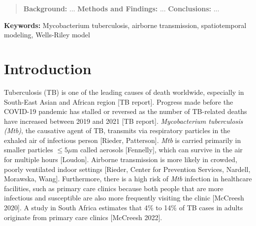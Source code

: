 \documentclass[fleqn,11pt]{wlscirep}
\begin{document}

\begin{abstract}\normalfont
\noindent\textbf{Background:} ... \medskip
\noindent\textbf{Methods and Findings:} ... 
\medskip %
\noindent\textbf{Conclusions:} ... 

\par
\end{abstract}


\flushbottom
\maketitle
\setcounter{page}{1}
\thispagestyle{fancy}

\vspace{2em}


\vspace{0.5em}

\noindent\textbf{Keywords:} Mycobacterium tuberculosis, airborne transmission, spatiotemporal modeling, Wells-Riley model
\newpage

\sloppy
\raggedbottom

\newpage

\section{Introduction} 

Tuberculosis (TB) is one of the leading causes of death worldwide, especially in South-East Asian and African region [TB report]. Progress made before the COVID-19 pandemic has stalled or reversed as the number of TB-related deaths have increased between 2019 and 2021 [TB report]. \emph{Mycobacterium tuberculosis (Mtb)}, the causative agent of TB, transmits via respiratory particles in the exhaled air of infectious person [Rieder, Patterson]. \emph{Mtb} is carried primarily in smaller particles $\leq5\mu$m called aerosols [Fennelly], which can survive in the air for multiple hours [Loudon]. Airborne transmission is more likely in crowded, poorly ventilated indoor settings [Rieder, Center for Prevention Services, Nardell, Morawska, Wang]. Furthermore, there is a high risk of \emph{Mtb} infection in healthcare facilities, such as primary care clinics because both people that are more infectious and susceptible are also more frequently visiting the clinic [McCreesh 2020]. A study in South Africa estimates that 4\% to 14\% of TB cases in adults originate from primary care clinics [McCreesh 2022].
\end{document}
